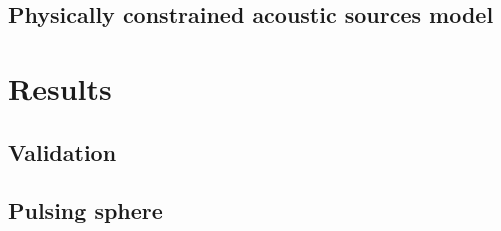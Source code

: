 \documentclass[9pt, xcolor={usenames, dvipsnames}]{beamer}
\begin{document}
			\subsection{Physically constrained acoustic sources model}

		\section{Results}
			
			\subsection{Validation}

			\subsection{Pulsing sphere}
\end{document}
